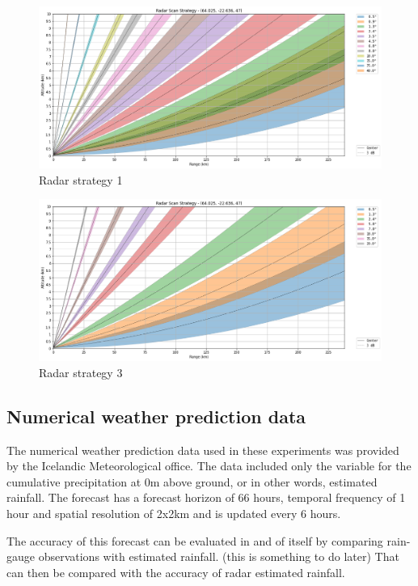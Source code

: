 \begin{figure}[H]
\centering\includegraphics[width=\textwidth]{Pictures/Diagrams/Radar strategies/Strategy 1.png}
\caption{Radar strategy 1}
\label{fig:radarstrat1}
\end{figure}

\begin{figure}[H]
\centering\includegraphics[width=\textwidth]{Pictures/Diagrams/Radar strategies/Strategy 3.png}
\caption{Radar strategy 3}
\label{fig:radarstrat3}
\end{figure}



\subsection{Numerical weather prediction data}
The numerical weather prediction data used in these experiments was provided by the Icelandic Meteorological office. The data included only the variable for the cumulative precipitation at 0m above ground, or in other words, estimated rainfall. The forecast has a forecast horizon of 66 hours, temporal frequency of 1 hour and spatial resolution of 2x2km and is updated every 6 hours. 

The accuracy of this forecast can be evaluated in and of itself by comparing rain-gauge observations with estimated rainfall. (this is something to do later) That can then be compared with the accuracy of radar estimated rainfall. 




